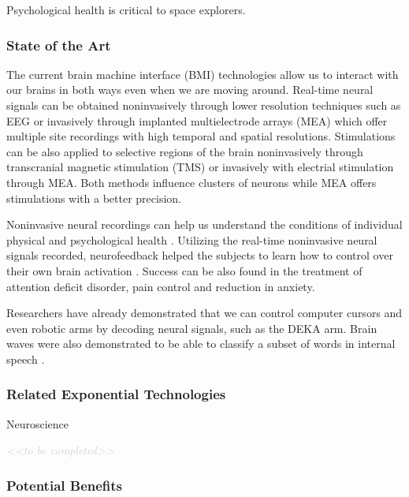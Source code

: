 \documentclass[letter,11pt]{article}
\newcommand{\todo}[1]{\textcolor{lightgray}{\textit{<<#1>>}}}
\newcommand{\tbc}{\begin{center} \todo{to be completed} \end{center}}
\begin{document}
Psychological health is critical to space explorers.

\subsubsection{State of the Art}

The current brain machine interface (BMI) technologies allow us to interact
with our brains in both ways even when we are moving around.  Real-time neural
signals can be obtained noninvasively through lower resolution techniques such
as EEG or invasively through implanted multielectrode arrays (MEA) which offer
multiple site recordings with high temporal and spatial resolutions.
Stimulations can be also applied to selective regions of the brain
noninvasively through transcranial magnetic stimulation (TMS) or invasively
with electrial stimulation through MEA. Both methods influence clusters of
neurons while MEA offers stimulations with a better precision.

Noninvasive neural recordings can help us understand the conditions of
individual physical and psychological health \cite{deCharms2008}. Utilizing
the real-time noninvasive neural signals recorded, neurofeedback helped the
subjects to learn how to control over their own brain activation
\cite{deCharms2008}. Success can be also found in the treatment of attention
deficit disorder, pain control and reduction in anxiety.

Researchers have already demonstrated that we can control computer cursors and
even robotic arms by decoding neural signals, such as the DEKA arm. Brain waves
were also demonstrated to be able to classify a subset of words in internal
speech \cite{Suppes1997}.

\subsubsection{Related Exponential Technologies}

Neuroscience
\tbc

\subsubsection{Potential Benefits}
\end{document}
